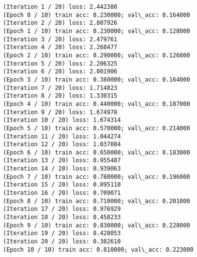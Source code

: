 \documentclass[11pt]{article}
\begin{document}
    \begin{Verbatim}[commandchars=\\\{\}]
(Iteration 1 / 20) loss: 2.442380
(Epoch 0 / 10) train acc: 0.230000; val\_acc: 0.164000
(Iteration 2 / 20) loss: 2.807926
(Epoch 1 / 10) train acc: 0.230000; val\_acc: 0.128000
(Iteration 3 / 20) loss: 2.479761
(Iteration 4 / 20) loss: 2.268477
(Epoch 2 / 10) train acc: 0.290000; val\_acc: 0.126000
(Iteration 5 / 20) loss: 2.206325
(Iteration 6 / 20) loss: 2.001906
(Epoch 3 / 10) train acc: 0.380000; val\_acc: 0.164000
(Iteration 7 / 20) loss: 1.714823
(Iteration 8 / 20) loss: 1.330315
(Epoch 4 / 10) train acc: 0.440000; val\_acc: 0.187000
(Iteration 9 / 20) loss: 1.674978
(Iteration 10 / 20) loss: 1.674314
(Epoch 5 / 10) train acc: 0.570000; val\_acc: 0.214000
(Iteration 11 / 20) loss: 1.044274
(Iteration 12 / 20) loss: 1.037084
(Epoch 6 / 10) train acc: 0.650000; val\_acc: 0.183000
(Iteration 13 / 20) loss: 0.955487
(Iteration 14 / 20) loss: 0.939063
(Epoch 7 / 10) train acc: 0.780000; val\_acc: 0.196000
(Iteration 15 / 20) loss: 0.895110
(Iteration 16 / 20) loss: 0.709071
(Epoch 8 / 10) train acc: 0.710000; val\_acc: 0.201000
(Iteration 17 / 20) loss: 0.976929
(Iteration 18 / 20) loss: 0.458233
(Epoch 9 / 10) train acc: 0.830000; val\_acc: 0.228000
(Iteration 19 / 20) loss: 0.428053
(Iteration 20 / 20) loss: 0.382610
(Epoch 10 / 10) train acc: 0.810000; val\_acc: 0.223000

    \end{Verbatim}
\end{document}
